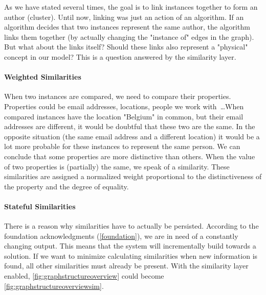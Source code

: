 As we have stated several times, the goal is to link instances together to form an author (cluster). Until now, linking was just an action of an algorithm. If an algorithm decides that two instances represent the same author, the algorithm links them together (by actually changing the "instance of" edges in the graph). But what about the links itself? Should these links also represent a "physical" concept in our model? This is a question answered by the similarity layer.

\paragraph{Weighted Similarities} When two instances are compared, we need to compare their properties. Properties could be email addresses, locations, people we work with~\ldots When compared instances have the location "Belgium" in common, but their email addresses are different, it would be doubtful that these two are the same. In the opposite situation (the same email address and a different location) it would be a lot more probable for these instances to represent the same person. We can conclude that some properties are more distinctive than others. When the value of two properties is (partially) the same, we speak of a similarity. These similarities are assigned a normalized weight proportional to the distinctiveness of the property and the degree of equality.


\paragraph{Stateful Similarities} There is a reason why similarities have to actually be persisted. According to the foundation acknowledgments (\autoref{foundation}), we are in need of a constantly changing output. This means that the system will incrementally build towards a solution. If we want to minimize calculating similarities when new information is found, all other similarities must already be present. With the similarity layer enabled, \autoref{fig:graphstructureoverview} could become \autoref{fig:graphstructureoverviewsim}.


